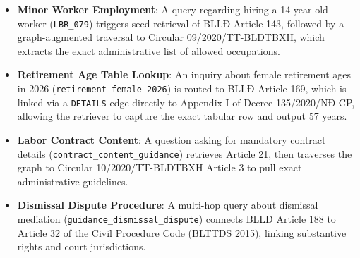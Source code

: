 \begin{itemize}
  \item \textbf{Minor Worker Employment}: A query regarding hiring a 14-year-old worker (\texttt{LBR\_079}) triggers seed retrieval of BLLĐ Article 143, followed by a graph-augmented traversal to Circular 09/2020/TT-BLDTBXH, which extracts the exact administrative list of allowed occupations.
  \item \textbf{Retirement Age Table Lookup}: An inquiry about female retirement ages in 2026 (\texttt{retirement\_female\_2026}) is routed to BLLĐ Article 169, which is linked via a \texttt{DETAILS} edge directly to Appendix I of Decree 135/2020/NĐ-CP, allowing the retriever to capture the exact tabular row and output 57 years.
  \item \textbf{Labor Contract Content}: A question asking for mandatory contract details (\texttt{contract\_content\_guidance}) retrieves Article 21, then traverses the graph to Circular 10/2020/TT-BLDTBXH Article 3 to pull exact administrative guidelines.
  \item \textbf{Dismissal Dispute Procedure}: A multi-hop query about dismissal mediation (\texttt{guidance\_dismissal\_dispute}) connects BLLĐ Article 188 to Article 32 of the Civil Procedure Code (BLTTDS 2015), linking substantive rights and court jurisdictions.
\end{itemize}
